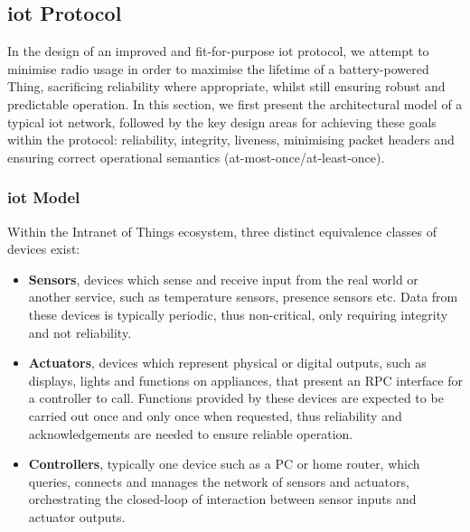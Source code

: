 \documentclass[conference]{./sty/IEEEtran}
\begin{document}
\subsection{iot Protocol} %
\label{sub:design_iot_protocol}
In the design of an improved and fit-for-purpose iot protocol, we attempt to minimise radio usage in order to maximise the lifetime of a battery-powered Thing, sacrificing reliability where appropriate, whilst still ensuring robust and predictable operation. In this section, we first present the architectural model of a typical iot network, followed by the key design areas for achieving these goals within the protocol: reliability, integrity, liveness, minimising packet headers and ensuring correct operational semantics (at-most-once/at-least-once). 

\subsubsection*{iot Model} %
\label{ssub:iot_model}
Within the Intranet of Things ecosystem, three distinct equivalence classes of devices exist:
\begin{itemize}
  \item \textbf{Sensors}, devices which sense and receive input from the real world or another service, such as temperature sensors, presence sensors etc. Data from these devices is typically periodic, thus non-critical, only requiring integrity and not reliability.
  \item \textbf{Actuators}, devices which represent physical or digital outputs, such as displays, lights and functions on appliances, that present an RPC interface for a controller to call. Functions provided by these devices are expected to be carried out once and only once when requested, thus reliability and acknowledgements are needed to ensure reliable operation. 
  \item \textbf{Controllers}, typically one device such as a PC or home router, which queries, connects and manages the network of sensors and actuators, orchestrating the closed-loop of interaction between sensor inputs and actuator outputs.
\end{itemize}
\end{document}
